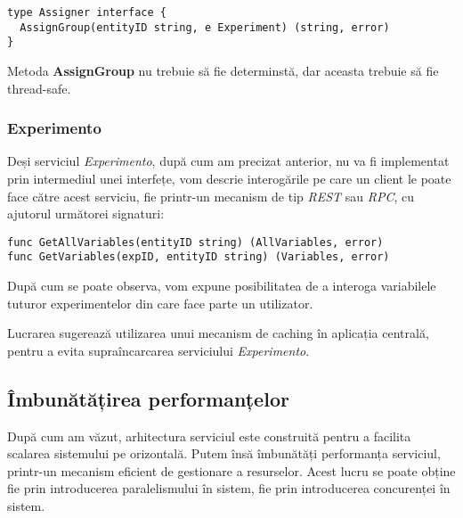 \begin{center}
	\begin{lstlisting}[language=proto3]
type Assigner interface {
  AssignGroup(entityID string, e Experiment) (string, error)
}
	\end{lstlisting}
\end{center}

\begin{remark}
	Metoda \textbf{AssignGroup} nu trebuie să fie determinstă, dar aceasta trebuie să fie thread-safe.
\end{remark}

\subsubsection{Experimento}

Deși serviciul \textit{Experimento}, după cum am precizat anterior, nu va fi implementat prin intermediul unei interfețe, vom descrie interogările pe care un client le poate face către acest serviciu, fie printr-un mecanism de tip \textit{REST} sau \textit{RPC}, cu ajutorul următorei signaturi:

\begin{center}
	\begin{lstlisting}[language=proto3]
func GetAllVariables(entityID string) (AllVariables, error)
func GetVariables(expID, entityID string) (Variables, error)
	\end{lstlisting}
\end{center}

După cum se poate observa, vom expune posibilitatea de a interoga variabilele tuturor experimentelor din care face parte un utilizator.

\begin{remark}
	Lucrarea sugerează utilizarea unui mecanism de caching în aplicația centrală, pentru a evita supraîncarcarea serviciului \textit{Experimento}.
\end{remark}

\subsection{Îmbunătățirea performanțelor}

După cum am văzut, arhitectura serviciul este construită pentru a facilita scalarea sistemului pe orizontală. Putem însă îmbunătăți performanța serviciul, printr-un mecanism eficient de gestionare a resurselor. Acest lucru se poate obține fie prin introducerea paralelismului în sistem, fie prin introducerea concurenței în sistem. 

